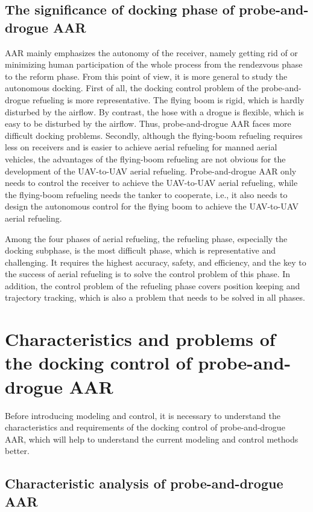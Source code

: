 \subsection{The significance of docking phase of probe-and-drogue AAR }

AAR mainly emphasizes the autonomy of the receiver, namely getting
rid of or minimizing human participation of the whole process from
the rendezvous phase to the reform phase. From this point of view,
it is more general to study the autonomous docking. First of all,
the docking control problem of the probe-and-drogue refueling is more
representative. The flying boom is rigid, which is hardly disturbed
by the airflow. By contrast, the hose with a drogue is flexible, which
is easy to be disturbed by the airflow. Thus, probe-and-drogue AAR
faces more difficult docking problems. Secondly, although the flying-boom
refueling requires less on receivers and is easier to achieve aerial
refueling for manned aerial vehicles, the advantages of the flying-boom
refueling are not obvious for the development of the UAV-to-UAV aerial
refueling. Probe-and-drogue AAR only needs to control the receiver
to achieve the UAV-to-UAV aerial refueling, while the flying-boom
refueling needs the tanker to cooperate, i.e., it also needs to design
the autonomous control for the flying boom to achieve the UAV-to-UAV
aerial refueling. 

Among the four phases of aerial refueling, the refueling phase, especially
the docking subphase, is the most difficult phase, which is representative
and challenging. It requires the highest accuracy, safety, and efficiency,
and the key to the success of aerial refueling is to solve the control
problem of this phase. In addition, the control problem of the refueling
phase covers position keeping and trajectory tracking, which is also
a problem that needs to be solved in all phases. 

\section{Characteristics and problems of the docking control of probe-and-drogue
AAR \label{sec:Characteristics-and-problems}}

Before introducing modeling and control, it is necessary to understand
the characteristics and requirements of the docking control of probe-and-drogue
AAR, which will help to understand the current modeling and control
methods better. 

\subsection{Characteristic analysis of probe-and-drogue AAR }

